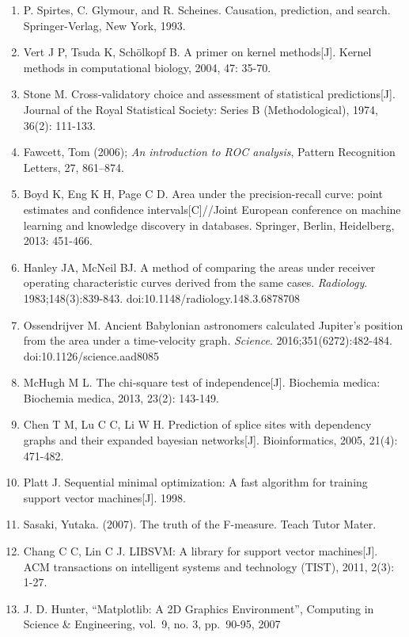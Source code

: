 \documentclass[11pt]{article}
\begin{document}
\begin{enumerate}
{  Information Retrieval}. Cambridge University Press, p.~260.
\item
  P. Spirtes, C. Glymour, and R. Scheines. Causation, prediction, and
  search. Springer-Verlag, New York, 1993.
\item
  Vert J P, Tsuda K, Schölkopf B. A primer on kernel methods{[}J{]}.
  Kernel methods in computational biology, 2004, 47: 35-70.
\item
  Stone M. Cross‐validatory choice and assessment of statistical
  predictions{[}J{]}. Journal of the Royal Statistical Society: Series B
  (Methodological), 1974, 36(2): 111-133.
\item
  Fawcett, Tom (2006); \emph{An introduction to ROC analysis}, Pattern
  Recognition Letters, 27, 861--874.
\item
  Boyd K, Eng K H, Page C D. Area under the precision-recall curve:
  point estimates and confidence intervals{[}C{]}//Joint European
  conference on machine learning and knowledge discovery in databases.
  Springer, Berlin, Heidelberg, 2013: 451-466.
\item
  Hanley JA, McNeil BJ. A method of comparing the areas under receiver
  operating characteristic curves derived from the same cases.
  \emph{Radiology}. 1983;148(3):839-843.
  doi:10.1148/radiology.148.3.6878708
\item
  Ossendrijver M. Ancient Babylonian astronomers calculated Jupiter's
  position from the area under a time-velocity graph. \emph{Science}.
  2016;351(6272):482-484. doi:10.1126/science.aad8085
\item
  McHugh M L. The chi-square test of independence{[}J{]}. Biochemia
  medica: Biochemia medica, 2013, 23(2): 143-149.
\item
  Chen T M, Lu C C, Li W H. Prediction of splice sites with dependency
  graphs and their expanded bayesian networks{[}J{]}. Bioinformatics,
  2005, 21(4): 471-482.
\item
  Platt J. Sequential minimal optimization: A fast algorithm for
  training support vector machines{[}J{]}. 1998.
\item
  Sasaki, Yutaka. (2007). The truth of the F-measure. Teach Tutor Mater.
\item
  Chang C C, Lin C J. LIBSVM: A library for support vector
  machines{[}J{]}. ACM transactions on intelligent systems and
  technology (TIST), 2011, 2(3): 1-27.
\item
  J. D. Hunter, ``Matplotlib: A 2D Graphics Environment'', Computing in
  Science \& Engineering, vol.~9, no. 3, pp.~90-95, 2007

\end{enumerate}
\end{document}
